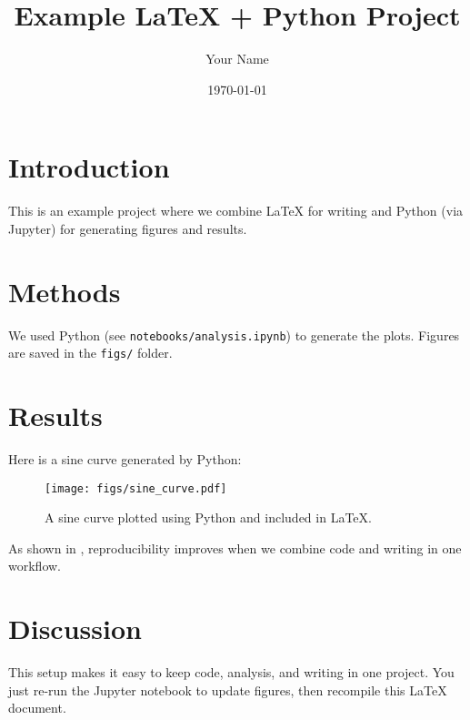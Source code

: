 \documentclass[12pt]{article}
\title{Example LaTeX + Python Project}
\author{Your Name}
\date{\today}
\begin{document}
\maketitle

\section{Introduction}
This is an example project where we combine \LaTeX{} for writing 
and Python (via Jupyter) for generating figures and results.

\section{Methods}
We used Python (see \texttt{notebooks/analysis.ipynb}) to generate 
the plots. Figures are saved in the \texttt{figs/} folder.

\section{Results}
Here is a sine curve generated by Python:

\begin{figure}[htbp]
    \centering
    \texttt{[image: figs/sine\_curve.pdf]}
    \caption{A sine curve plotted using Python and included in \LaTeX{}.}
    \label{fig:sine}
\end{figure}

As shown in \cite{example2020}, reproducibility improves 
when we combine code and writing in one workflow.

\section{Discussion}
This setup makes it easy to keep code, analysis, and writing 
in one project. You just re-run the Jupyter notebook to update 
figures, then recompile this \LaTeX{} document.



\end{document}
